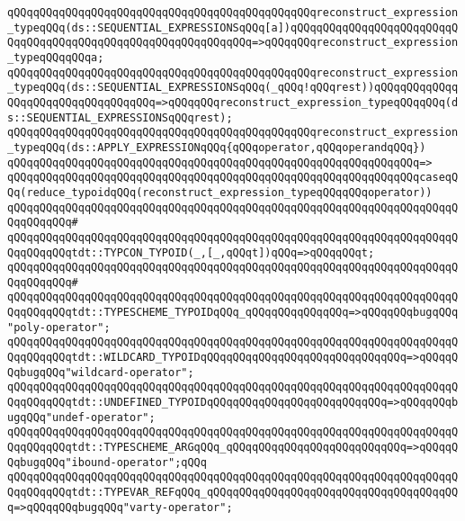 \verb|qQQqqQQqqQQqqQQqqQQqqQQqqQQqqQQqqQQqqQQqqQQqqQQqreconstruct_expression_typeqQQq(ds::SEQUENTIAL_EXPRESSIONSqQQq[a])qQQqqQQqqQQqqQQqqQQqqQQqqQQqqQQqqQQqqQQqqQQqqQQqqQQqqQQqqQQqqQQq=>qQQqqQQqreconstruct_expression_typeqQQqqQQqa;|\newline
\verb|qQQqqQQqqQQqqQQqqQQqqQQqqQQqqQQqqQQqqQQqqQQqqQQqreconstruct_expression_typeqQQq(ds::SEQUENTIAL_EXPRESSIONSqQQq(_qQQq!qQQqrest))qQQqqQQqqQQqqQQqqQQqqQQqqQQqqQQqqQQq=>qQQqqQQqreconstruct_expression_typeqQQqqQQq(ds::SEQUENTIAL_EXPRESSIONSqQQqrest);|\newline
\newline
\verb|qQQqqQQqqQQqqQQqqQQqqQQqqQQqqQQqqQQqqQQqqQQqqQQqreconstruct_expression_typeqQQq(ds::APPLY_EXPRESSIONqQQq{qQQqoperator,qQQqoperandqQQq})|\newline
\verb|qQQqqQQqqQQqqQQqqQQqqQQqqQQqqQQqqQQqqQQqqQQqqQQqqQQqqQQqqQQqqQQq=>|\newline
\verb|qQQqqQQqqQQqqQQqqQQqqQQqqQQqqQQqqQQqqQQqqQQqqQQqqQQqqQQqqQQqqQQqcaseqQQq(reduce_typoidqQQq(reconstruct_expression_typeqQQqqQQqoperator))|\newline
\verb|qQQqqQQqqQQqqQQqqQQqqQQqqQQqqQQqqQQqqQQqqQQqqQQqqQQqqQQqqQQqqQQqqQQqqQQqqQQqqQQq#|\newline
\verb|qQQqqQQqqQQqqQQqqQQqqQQqqQQqqQQqqQQqqQQqqQQqqQQqqQQqqQQqqQQqqQQqqQQqqQQqqQQqqQQqtdt::TYPCON_TYPOID(_,[_,qQQqt])qQQq=>qQQqqQQqt;|\newline
\verb|qQQqqQQqqQQqqQQqqQQqqQQqqQQqqQQqqQQqqQQqqQQqqQQqqQQqqQQqqQQqqQQqqQQqqQQqqQQqqQQq#|\newline
\verb|qQQqqQQqqQQqqQQqqQQqqQQqqQQqqQQqqQQqqQQqqQQqqQQqqQQqqQQqqQQqqQQqqQQqqQQqqQQqqQQqtdt::TYPESCHEME_TYPOIDqQQq_qQQqqQQqqQQqqQQq=>qQQqqQQqbugqQQq"poly-operator";|\newline
\verb|qQQqqQQqqQQqqQQqqQQqqQQqqQQqqQQqqQQqqQQqqQQqqQQqqQQqqQQqqQQqqQQqqQQqqQQqqQQqqQQqtdt::WILDCARD_TYPOIDqQQqqQQqqQQqqQQqqQQqqQQqqQQqqQQq=>qQQqqQQqbugqQQq"wildcard-operator";|\newline
\verb|qQQqqQQqqQQqqQQqqQQqqQQqqQQqqQQqqQQqqQQqqQQqqQQqqQQqqQQqqQQqqQQqqQQqqQQqqQQqqQQqtdt::UNDEFINED_TYPOIDqQQqqQQqqQQqqQQqqQQqqQQqqQQq=>qQQqqQQqbugqQQq"undef-operator";|\newline
\verb|qQQqqQQqqQQqqQQqqQQqqQQqqQQqqQQqqQQqqQQqqQQqqQQqqQQqqQQqqQQqqQQqqQQqqQQqqQQqqQQqtdt::TYPESCHEME_ARGqQQq_qQQqqQQqqQQqqQQqqQQqqQQqqQQq=>qQQqqQQqbugqQQq"ibound-operator";qQQq|\newline
\verb|qQQqqQQqqQQqqQQqqQQqqQQqqQQqqQQqqQQqqQQqqQQqqQQqqQQqqQQqqQQqqQQqqQQqqQQqqQQqqQQqtdt::TYPEVAR_REFqQQq_qQQqqQQqqQQqqQQqqQQqqQQqqQQqqQQqqQQqqQQq=>qQQqqQQqbugqQQq"varty-operator";|\newline
